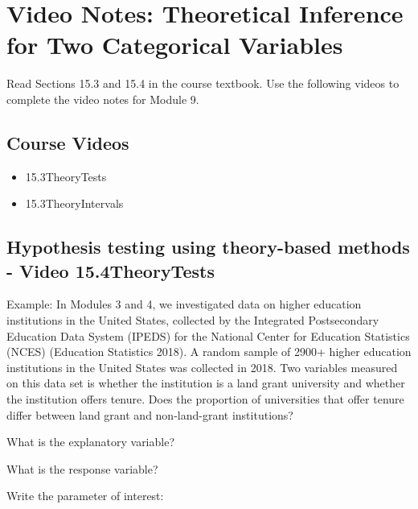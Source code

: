 \documentclass[
]{report}
\begin{document}
\section{Video Notes: Theoretical Inference for Two Categorical Variables}\label{video-notes-theoretical-inference-for-two-categorical-variables}

Read Sections 15.3 and 15.4 in the course textbook. Use the following videos to complete the video notes for Module 9.

\subsection{Course Videos}\label{course-videos-7}

\begin{itemize}
\item
  15.3TheoryTests
\item
  15.3TheoryIntervals
\end{itemize}


\subsection*{Hypothesis testing using theory-based methods - Video 15.4TheoryTests}\label{hypothesis-testing-using-theory-based-methods---video-15.4theorytests}

Example: In Modules 3 and 4, we investigated data on higher education institutions in the United States, collected by the Integrated Postsecondary Education Data System (IPEDS) for the National Center for Education Statistics (NCES) (Education Statistics 2018). A random sample of 2900+ higher education institutions in the United States was collected in 2018. Two variables measured on this data set is whether the institution is a land grant university and whether the institution offers tenure. Does the proportion of universities that offer tenure differ between land grant and non-land-grant institutions?

What is the explanatory variable?

\vspace{0.2in}

What is the response variable?

\vspace{0.2in}

Write the parameter of interest:
\end{document}
